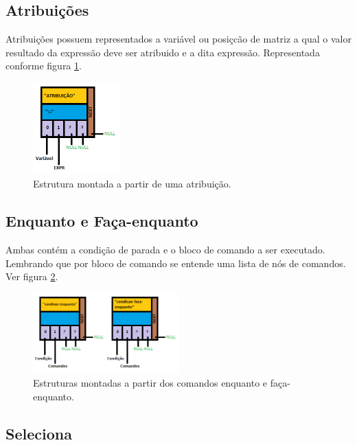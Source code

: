 \documentclass[a4paper,12pt]{report}
\begin{document}
\subsection{Atribui\c{c}\~oes}

Atribui\c{c}\~oes possuem representados a vari\'avel ou posi\c{c}c\~ao de matriz a qual o valor resultado da express\~ao deve ser atribuido e a dita express\~ao. Representada conforme figura \ref{fig:atribuicoes}.

\begin{figure}
\centering
\includegraphics[width=0.3\textwidth]{imgs/Atribui__p.png}
\caption{\label{fig:atribuicoes}Estrutura montada a partir de uma atribui\c{c}\~ao.}
\end{figure}

\subsection{Enquanto e Fa\c{c}a-enquanto}

Ambas cont\'em a condi\c{c}\~ao de parada e o bloco de comando a ser executado. Lembrando que por bloco de comando se entende uma lista de n\'os de comandos. Ver figura \ref{fig:enquanto}.

\begin{figure}
\centering
\includegraphics[width=0.5\textwidth]{imgs/enquanto_e_faca-enquanto.png}
\caption{\label{fig:enquanto}Estruturas montadas a partir dos comandos enquanto e fa\c{c}a-enquanto.}
\end{figure}

\subsection{Seleciona}
\end{document}
